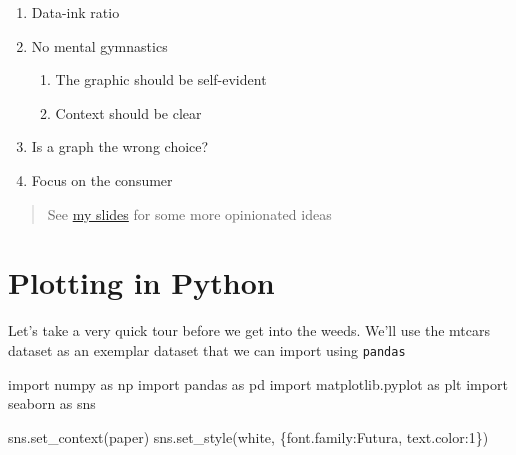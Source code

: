 \documentclass[
  letterpaper,
]{scrbook}
\newenvironment{Shaded}{\begin{snugshade}}{\end{snugshade}}
\newcommand{\ImportTok}[1]{#1}
\newcommand{\NormalTok}[1]{#1}
\newcommand{\StringTok}[1]{\textcolor[rgb]{0.31,0.60,0.02}{#1}}
\providecommand{\tightlist}{%
  \setlength{\itemsep}{0pt}\setlength{\parskip}{0pt}}
\begin{document}
\begin{enumerate}
\def\labelenumi{\arabic{enumi}.}
\tightlist
\item
  Data-ink ratio
\item
  No mental gymnastics

  \begin{enumerate}
  \def\labelenumii{\arabic{enumii}.}
  \tightlist
  \item
    The graphic should be self-evident
  \item
    Context should be clear
  \end{enumerate}
\item
  Is a graph the wrong choice?
\item
  Focus on the consumer
\end{enumerate}

\begin{quote}
See \href{http://araastat.com/BIOF439/lectures/01-DataViz.pdf}{my slides} for some more opinionated ideas
\end{quote}

\hypertarget{plotting-in-python}{%
\section{Plotting in Python}\label{plotting-in-python}}

Let's take a very quick tour before we get into the weeds. We'll use the mtcars dataset as an exemplar dataset that we can import using \texttt{pandas}

\begin{Shaded}
\begin{Highlighting}[]
\ImportTok{import}\NormalTok{ numpy }\ImportTok{as}\NormalTok{ np}
\ImportTok{import}\NormalTok{ pandas }\ImportTok{as}\NormalTok{ pd}
\ImportTok{import}\NormalTok{ matplotlib.pyplot }\ImportTok{as}\NormalTok{ plt}
\ImportTok{import}\NormalTok{ seaborn }\ImportTok{as}\NormalTok{ sns}
\end{Highlighting}
\end{Shaded}

\begin{Shaded}
\begin{Highlighting}[]
\NormalTok{sns.set\_context(}\StringTok{\textquotesingle{}paper\textquotesingle{}}\NormalTok{)}
\NormalTok{sns.set\_style(}\StringTok{\textquotesingle{}white\textquotesingle{}}\NormalTok{, \{}\StringTok{\textquotesingle{}font.family\textquotesingle{}}\NormalTok{:}\StringTok{\textquotesingle{}Futura\textquotesingle{}}\NormalTok{, }\StringTok{\textquotesingle{}text.color\textquotesingle{}}\NormalTok{:}\StringTok{\textquotesingle{}1\textquotesingle{}}\NormalTok{\})}
\end{Highlighting}
\end{Shaded}
\end{document}
